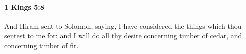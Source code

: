 
		\paragraph{1 Kings 5:8} %
			\label{1KINGS-5-8}

			And Hiram sent to Solomon, saying, I have considered the things which thou sentest to me for: and I will do all thy desire concerning timber of cedar, and concerning timber of fir.


